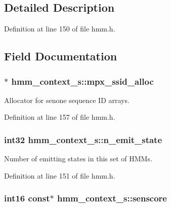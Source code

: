 \subsection{Detailed Description}


Definition at line 150 of file hmm.\-h.



\subsection{Field Documentation}
\subsubsection[{mpx\-\_\-ssid\-\_\-alloc}]{$\ast$ hmm\-\_\-context\-\_\-s\-::mpx\-\_\-ssid\-\_\-alloc}\label{structhmm__context__s_a63486d186a984a87d060064e65fab564}


Allocator for senone sequence I\-D arrays. 



Definition at line 157 of file hmm.\-h.

\subsubsection[{n\-\_\-emit\-\_\-state}]{\setlength{\rightskip}{0pt plus 5cm}int32 hmm\-\_\-context\-\_\-s\-::n\-\_\-emit\-\_\-state}\label{structhmm__context__s_a27ba4c5db11110bddf240dd52ed36084}


Number of emitting states in this set of H\-M\-Ms. 



Definition at line 151 of file hmm.\-h.

\subsubsection[{senscore}]{\setlength{\rightskip}{0pt plus 5cm}int16 const$\ast$ hmm\-\_\-context\-\_\-s\-::senscore}\label{structhmm__context__s_a1cca9eb94bc20d9c5e60f2da18074397}


